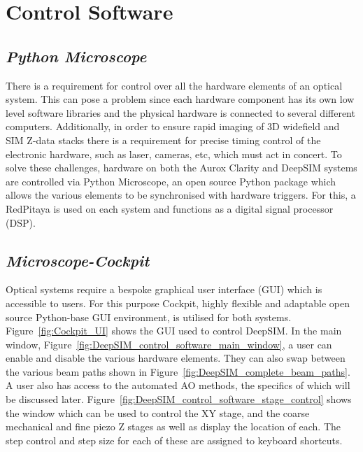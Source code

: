 \section{Control Software}
\label{sec:control_software}

\subsection{\textit{Python Microscope}}
\label{subsec:microscope}

There is a requirement for control over all the hardware elements of an optical system. This can pose a problem since each hardware component has its own low level software libraries and the physical hardware is connected to several different computers. Additionally, in order to ensure rapid imaging of 3D widefield and SIM Z-data stacks there is a requirement for precise timing control of the electronic hardware, such as laser, cameras, etc, which must act in concert. To solve these challenges, hardware on both the Aurox Clarity and DeepSIM systems are controlled via Python Microscope, an open source Python package which allows the various elements to be synchronised with hardware triggers. For this, a RedPitaya is used on each system and functions as a digital signal processor (DSP).

\subsection{\textit{Microscope-Cockpit}}
\label{subsec:cockpit}

Optical systems require a bespoke graphical user interface (GUI) which is accessible to users. For this purpose Cockpit, highly flexible and adaptable open source Python-base GUI environment, is utilised for both systems. Figure~\ref{fig:Cockpit_UI} shows the GUI used to control DeepSIM. In the main window, Figure~\ref{fig:DeepSIM_control_software_main_window}, a user can enable and disable the various hardware elements. They can also swap between the various beam paths shown in Figure~\ref{fig:DeepSIM_complete_beam_paths}. A user also has access to the automated AO methods, the specifics of which will be discussed later. Figure~\ref{fig:DeepSIM_control_software_stage_control} shows the window which can be used to control the XY stage, and the coarse mechanical and fine piezo Z stages as well as display the location of each. The step control and step size for each of these are assigned to keyboard shortcuts. 

